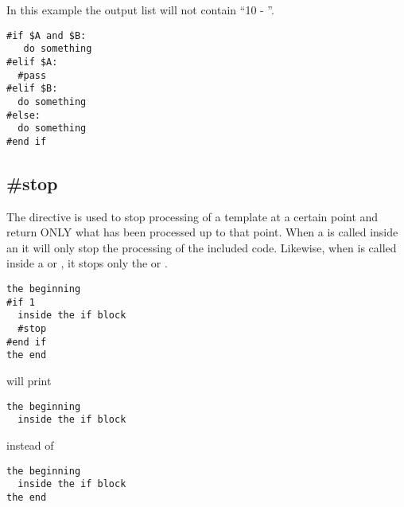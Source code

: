 In this example the output list will not contain ``10 - ''. 
\begin{verbatim}
#if $A and $B:
   do something
#elif $A:
  #pass
#elif $B: 
  do something
#else:
  do something
#end if
\end{verbatim}

\subsection{\#stop}
\label{flowControl.stop}

The  directive is used to stop processing of a template at a
certain point and return ONLY what has been processed up to that point.  When a
 is called inside an  it will only stop the
processing of the included code.  Likewise, when  is called inside
a  or , it stops only the  or
.

\begin{verbatim}
the beginning
#if 1
  inside the if block
  #stop
#end if
the end
\end{verbatim}

will print 
\begin{verbatim}
the beginning
  inside the if block
\end{verbatim}

instead of 
\begin{verbatim}
the beginning
  inside the if block
the end
\end{verbatim}



